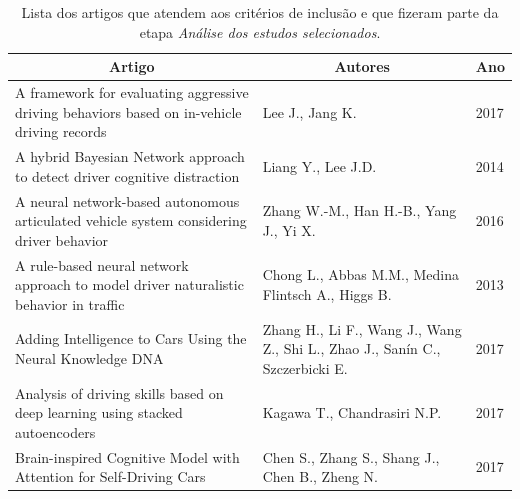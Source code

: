 \documentclass[10pt,journal,compsoc]{IEEEtran}
\begin{document}
\begin{table}[!t]
\renewcommand{\arraystretch}{1.3}
\caption{Lista dos artigos que atendem aos critérios de inclusão e
  que fizeram parte da etapa \emph{Análise dos estudos selecionados}.}
\label{tab:artigosdossie}
\centering
\begin{tabular}{p{10cm}p{7cm}l}
\multicolumn{1}{c}{\textbf{Artigo}}
  & \multicolumn{1}{c}{\textbf{Autores}}
  & \multicolumn{1}{c}{\textbf{Ano}} \\ \hline
A framework for evaluating aggressive driving behaviors based on in-vehicle driving records                                                      & Lee J., Jang K.                                                              & 2017                             \\
A hybrid Bayesian Network approach to detect driver cognitive distraction                                                                        & Liang Y., Lee J.D.                                                           & 2014                             \\
A neural network-based autonomous articulated vehicle system considering driver behavior                                                         & Zhang W.-M., Han H.-B., Yang J., Yi X.                                       & 2016                             \\
A rule-based neural network approach to model driver naturalistic behavior in traffic                                                            & Chong L., Abbas M.M., Medina Flintsch A., Higgs B.                           & 2013                             \\
Adding Intelligence to Cars Using the Neural Knowledge DNA                                                                                       & Zhang H., Li F., Wang J., Wang Z., Shi L., Zhao J., Sanín C., Szczerbicki E. & 2017                             \\
Analysis of driving skills based on deep learning using stacked autoencoders                                                                     & Kagawa T., Chandrasiri N.P.                                                  & 2017                             \\
Brain-inspired Cognitive Model with Attention for Self-Driving Cars                                                                              & Chen S., Zhang S., Shang J., Chen B., Zheng N.                               & 2017                             \\

\end{tabular}
\end{table}
\end{document}
